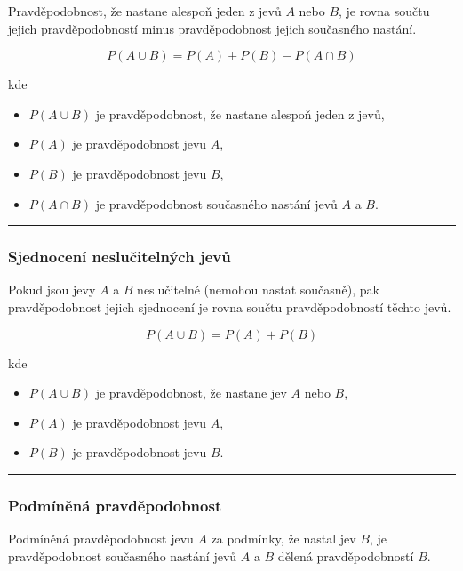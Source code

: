 \documentclass[a4paper, 11pt]{article}
\begin{document}
Pravděpodobnost, že nastane alespoň jeden z jevů $A$ nebo $B$,
je rovna součtu jejich pravděpodobností minus pravděpodobnost
jejich současného nastání.

\begin{equation*}
	P(A \cup B) = P(A) + P(B) - P(A \cap B)
\end{equation*}

kde

\begin{itemize}[noitemsep]
	\item $P(A \cup B)$ je pravděpodobnost, že nastane alespoň jeden z jevů,
	\item $P(A)$ je pravděpodobnost jevu $A$,
	\item $P(B)$ je pravděpodobnost jevu $B$,
	\item $P(A \cap B)$ je pravděpodobnost současného nastání jevů $A$ a $B$.
\end{itemize}

\noindent\hrule\medskip

\subsubsection{Sjednocení neslučitelných jevů}

Pokud jsou jevy $A$ a $B$ neslučitelné (nemohou nastat současně),
pak pravděpodobnost jejich sjednocení je rovna součtu
pravděpodobností těchto jevů.

\begin{equation*}
	P(A \cup B) = P(A) + P(B)
\end{equation*}

kde

\begin{itemize}[noitemsep]
	\item $P(A \cup B)$ je pravděpodobnost, že nastane jev $A$ nebo $B$,
	\item $P(A)$ je pravděpodobnost jevu $A$,
	\item $P(B)$ je pravděpodobnost jevu $B$.
\end{itemize}

\noindent\hrule\medskip

\subsubsection{Podmíněná pravděpodobnost}

Podmíněná pravděpodobnost jevu $A$ za podmínky, že nastal jev $B$,
je pravděpodobnost současného nastání jevů $A$ a $B$ dělená pravděpodobností $B$.
\end{document}
